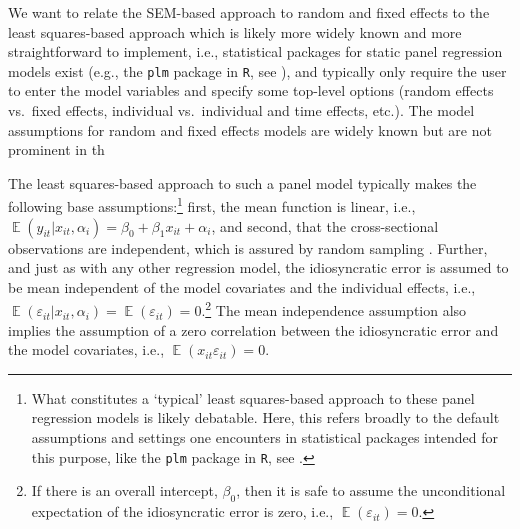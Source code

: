 \documentclass[]{interact}
\theoremstyle{plain}%
\theoremstyle{definition}
\theoremstyle{remark}
\begin{document}
We want to relate the SEM-based approach to random and fixed effects to
the least squares-based approach which is likely more widely known and
more straightforward to implement, i.e., statistical packages for static
panel regression models exist (e.g., the \texttt{plm} package in
\texttt{R}, see \citet{R-plm_a}), and typically only require the user to
enter the model variables and specify some top-level options (random
effects vs.~fixed effects, individual vs.~individual and time effects,
etc.). The model assumptions for random and fixed effects models are
widely known
\citep{Wooldridge2012, Bruederl2015, Greene2012, Angrist2009} but are
not prominent in th

The least squares-based approach to such a panel model typically makes
the following base assumptions:\footnote{What constitutes a `typical'
  least squares-based approach to these panel regression models is
  likely debatable. Here, this refers broadly to the default assumptions
  and settings one encounters in statistical packages intended for this
  purpose, like the \texttt{plm} package in \texttt{R}, see
  \citet{R-plm_a}.} first, the mean function is linear, i.e.,
\(\mathop{\mathrm{\mathbb{E}}}(y_{it} | x_{it}, \alpha_{i}) = \beta_{0} + \beta_{1} x_{it} + \alpha_{i}\),
and second, that the cross-sectional observations are independent, which
is assured by random sampling \citep{Wooldridge2012}. Further, and just
as with any other regression model, the idiosyncratic error is assumed
to be mean independent of the model covariates and the individual
effects, i.e.,
\(\mathop{\mathrm{\mathbb{E}}}(\varepsilon_{it} | x_{it}, \alpha_{i}) = \mathop{\mathrm{\mathbb{E}}}(\varepsilon_{it}) = 0\).\footnote{If
  there is an overall intercept, \(\beta_{0}\), then it is safe to
  assume the unconditional expectation of the idiosyncratic error is
  zero, i.e., \(\mathop{\mathrm{\mathbb{E}}}(\varepsilon_{it}) = 0\).}
The mean independence assumption also implies the assumption of a zero
correlation between the idiosyncratic error and the model covariates,
i.e., \(\mathop{\mathrm{\mathbb{E}}}(x_{it}\varepsilon_{it}) = 0\).
\end{document}
